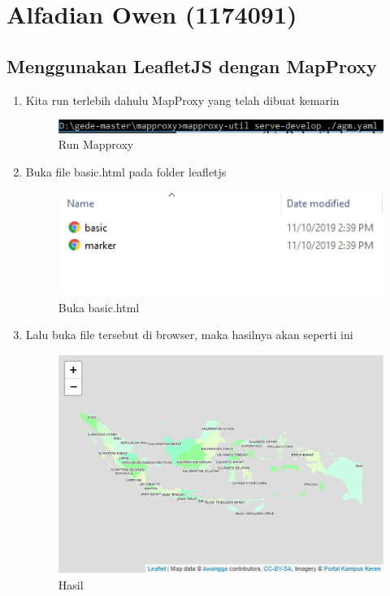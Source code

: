 \section{Alfadian Owen (1174091)}
\subsection{Menggunakan LeafletJS dengan MapProxy}
\begin{enumerate}
	\item Kita run terlebih dahulu MapProxy yang telah dibuat kemarin
    \hfill\break
    \begin{figure}[H]
		\includegraphics[width=12cm]{figures/Tugas5/1174091/1.png}
		\centering
		\caption{Run Mapproxy}
	\end{figure}
	
	\item Buka file basic.html pada folder leafletjs
    \hfill\break
    \begin{figure}[H]
		\includegraphics[width=12cm]{figures/Tugas5/1174091/2.png}
		\centering
		\caption{Buka basic.html}
	\end{figure}
	
	\item Lalu buka file tersebut di browser, maka hasilnya akan seperti ini
    \hfill\break
    \begin{figure}[H]
		\includegraphics[width=12cm]{figures/Tugas5/1174091/3.png}
		\centering
		\caption{Hasil }
	\end{figure}
	

\end{enumerate}
